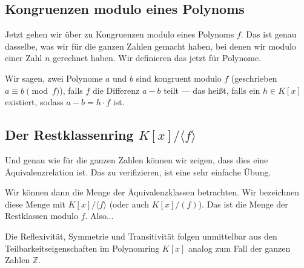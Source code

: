 \subsection{Kongruenzen modulo eines Polynoms}

\begin{spoken-clean}[00:39:47 - 00:42:42]
Jetzt gehen wir über zu Kongruenzen modulo eines Polynoms $f$. Das ist genau dasselbe, was wir für die ganzen Zahlen gemacht haben, bei denen wir modulo einer Zahl $n$ gerechnet haben. Wir definieren das jetzt für Polynome.

Wir sagen, zwei Polynome $a$ und $b$ sind kongruent modulo $f$ (geschrieben $a \equiv b \pmod f$), falls $f$ die Differenz $a - b$ teilt --- das heißt, falls ein $h \in K[x]$ existiert, sodass $a - b = h \cdot f$ ist.
\end{spoken-clean}

\begin{math-stroke}
\end{math-stroke}

\subsection{Der Restklassenring \texorpdfstring{$K[x]/\langle f \rangle$}{K[x]/(f)}}

\begin{spoken-clean}[00:42:42 - 00:44:24]
Und genau wie für die ganzen Zahlen können wir zeigen, dass dies eine Äquivalenzrelation ist. Das zu verifizieren, ist eine sehr einfache Übung.

Wir können dann die Menge der Äquivalenzklassen betrachten. Wir bezeichnen diese Menge mit $K[x]/\langle f \rangle$ (oder auch $K[x]/(f)$). Das ist die Menge der Restklassen modulo $f$. Also...
\end{spoken-clean}

\begin{math-stroke}

\begin{short-proof}
Die Reflexivität, Symmetrie und Transitivität folgen unmittelbar aus den Teilbarkeitseigenschaften im Polynomring $K[x]$ analog zum Fall der ganzen Zahlen $\mathbb{Z}$.
\end{short-proof}
\end{math-stroke}


